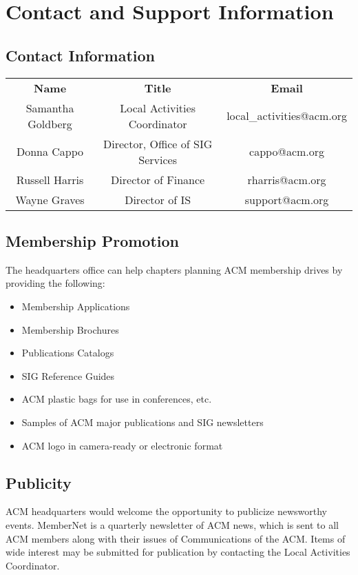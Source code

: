 %
%

\chapter{Contact and Support Information}
\label{app:app01}

\section*{Contact Information}
\begin{center}
\begin{tabular}{ c c c }
\textbf{Name} & \textbf{Title} & \textbf{E\-mail} \\
Samantha Goldberg & Local Activities Coordinator & local\_activities@acm.org \\
Donna Cappo & Director, Office of SIG Services & cappo@acm.org \\
Russell Harris & Director of Finance & rharris@acm.org \\
Wayne Graves & Director of IS & support@acm.org
\end{tabular}
\end{center}

\section*{Membership Promotion}
The headquarters office can help chapters planning ACM membership drives by providing the following:
\begin{itemize}
	\item Membership Applications
    \item Membership Brochures
	\item Publications Catalogs
	\item SIG Reference Guides
	\item ACM plastic bags for use in conferences, etc.
	\item Samples of ACM major publications and SIG newsletters
	\item ACM logo in camera-ready or electronic format
\end{itemize}

\section*{Publicity}
ACM headquarters would welcome the opportunity to publicize newsworthy events. MemberNet is a quarterly newsletter of ACM news, which is sent to all ACM members along with their issues of Communications of the ACM. Items of wide interest may be submitted for publication by contacting the Local Activities Coordinator.

